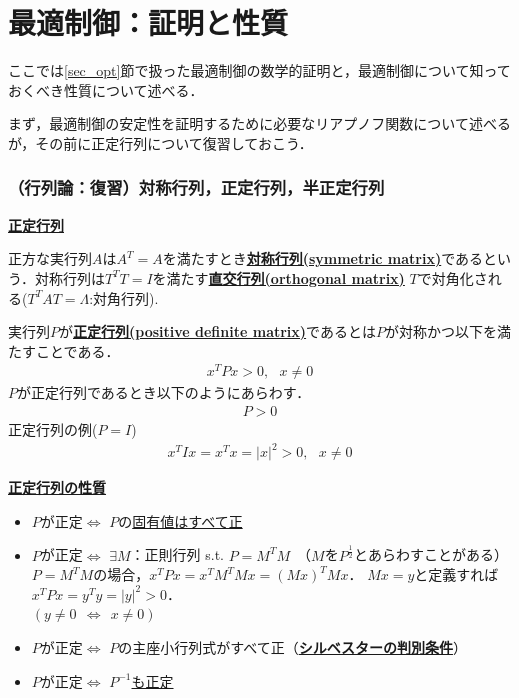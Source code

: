 \section{最適制御：証明と性質}

ここでは\ref{sec_opt}節で扱った最適制御の数学的証明と，最適制御について知っておくべき性質について述べる．

まず，最適制御の安定性を証明するために必要なリアプノフ関数について述べるが，その前に正定行列について復習しておこう．


\subsubsection{（行列論：復習）対称行列，正定行列，半正定行列}
\noindent
{\bf \underline{正定行列}}

正方な実行列$A$は$A^T=A$を満たすとき{\bf \underline{対称行列(symmetric matrix)}}であるという．対称行列は$T^T T=I$を満たす{\bf \underline{直交行列(orthogonal matrix)}} $T$で対角化される($T^T A T = \Lambda$:対角行列).

実行列$P$が{\bf \underline{正定行列(positive definite matrix)}}であるとは$P$が対称かつ以下を満たすことである．
\begin{eqnarray}
	x^T P x > 0, \ \ \ x \neq 0
\end{eqnarray}
$P$が正定行列であるとき以下のようにあらわす．
\begin{eqnarray}
	P>0
\end{eqnarray}
正定行列の例($ P = I $)
\begin{eqnarray}
	x^T I x = x^T x = \vert x \vert^2 > 0, \ \ \ x \neq 0
\end{eqnarray}

\noindent
{\bf \underline{正定行列の性質}}
\begin{itemize}
  \item $P$が正定$\Leftrightarrow$ $P$の{\underline{固有値はすべて正}}
  \item $P$が正定$\Leftrightarrow$ $\exists M$：正則行列 s.t. {\bf \underline{$P = M^T M$}}　（$M$を$P^{\frac{1}{2}}$とあらわすことがある）\\
  	$P=M^TM$の場合，$x^T P x = x^T M^T M x = (Mx)^T Mx $．
  	$Mx=y$と定義すれば$x^T P x = y^T y = \vert y \vert^2>0$．\\
  	$(y \neq 0 \ \ \Leftrightarrow \ \ x \neq 0)$
  \item $P$が正定$\Leftrightarrow$ $P$の主座小行列式がすべて正（{\bf \underline{シルベスターの判別条件}}）
  \item $P$が正定$\Leftrightarrow$ {\underline{$P^{-1}$も正定}}
\end{itemize}


